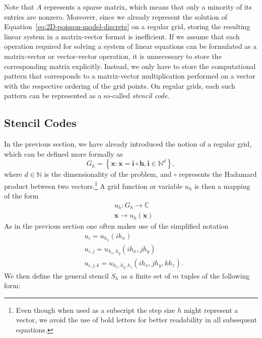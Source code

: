 Note that $A$ represents a sparse matrix, which means that only a minority of its entries are nonzero.
Moreover, since we already represent the solution of Equation~\eqref{eq:2D-poisson-model-discrete} on a regular grid, storing the resulting linear system in a matrix-vector format is inefficient.
If we assume that each operation required for solving a system of linear equations can be formulated as a matrix-vector or vector-vector operation, it is unnecessary to store the corresponding matrix explicitly.
Instead, we only have to store the computational pattern that corresponds to a matrix-vector multiplication performed on a vector with the respective ordering of the grid points.
On regular grids, each such pattern can be represented as a so-called \emph{stencil code}.

\subsection{Stencil Codes}
\label{subsec:stencil-codes}
In the previous section, we have already introduced the notion of a regular grid, which can be defined more formally as
\begin{equation}
	G_{h} = \left\{ \bm{x} : \bm{x} = \bm{i} \circ \bm{h}, \bm{i} \in \mathbb{N}^d \right\},
\end{equation}
where $d \in \mathbb{N}$ is the dimensionality of the problem, and $\circ$ represents the Hadamard product between two vectors.\footnote{Even though when used as a subscript the step size $h$ might represent a vector, we avoid the use of bold letters for better readability in all subsequent equations.}
A grid function or variable $u_h$ is then a mapping of the form
\begin{equation}
	\begin{split}
		& u_h : G_{h}\to \mathbb{C} \\
		& \bm{x} \to u_h(\bm{x})
	\end{split}
\end{equation}
As in the previous section one often makes use of the simplified notation
\begin{equation}
	\begin{split}
		 & u_i = u_{h_x}(i h_x) \\
		& u_{i,j} = u_{h_x, h_y}(i h_x, j h_y) \\
		& u_{i,j,k} = u_{h_x, h_y, h_z}(i h_x, j h_y, k h_z).
	\end{split}
\end{equation}
We then define the general stencil $S_h$ as a finite set of $m$ tuples of the following form:

